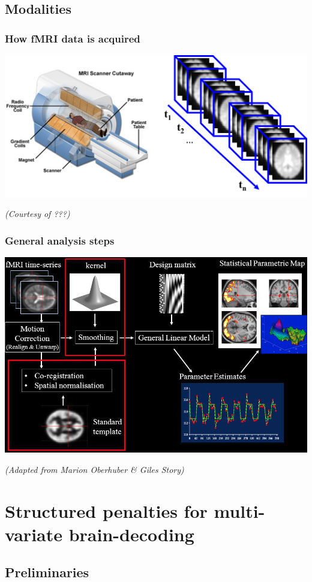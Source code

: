 \documentclass{beamer}
\begin{document}
\subsection{Modalities}
\begin{frame}\frametitle{How fMRI data is acquired}
    \centering
    \includegraphics[scale=.4]{fmri_setup}

\tiny{\textit{(Courtesy of ???)}}
\end{frame}

\begin{frame}
  \frametitle{General analysis steps}
\includegraphics[width=.9\linewidth]{norm.png}

\tiny \textit{(Adapted from Marion Oberhuber \& Giles Story)}
\end{frame}



\section{Structured penalties for multi-variate brain-decoding}
\subsection{Preliminaries}
\end{document}
